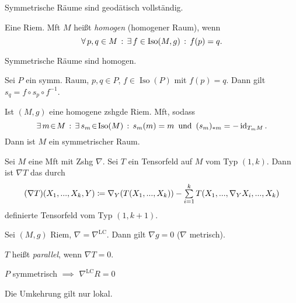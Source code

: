 \documentclass{cheat-sheet}
\DeclareMathOperator{\Iso}{Iso} %
\newcommand{\LC}{\nabla^{\mathrm{LC}}} %
\begin{document}
\begin{kor}
  Symmetrische Räume sind geodätisch vollständig.
\end{kor}

\begin{defn}
  Eine Riem. Mft $M$ heißt \emph{homogen} (homogener Raum), wenn
  \[ \fa{p, q \in M} \ex{f \in \Iso(M, g)} f(p) = q. \]
\end{defn}

\begin{lem}
  Symmetrische Räume sind homogen.
\end{lem}

\begin{lem}
  Sei $P$ ein symm. Raum, $p, q \in P$, $f \in \Iso(P)$ mit $f(p) = q$. Dann gilt $s_q = f \circ s_p \circ f^{-1}$.
\end{lem}

\begin{kor}
  Ist $(M, g)$ eine homogene zshgde Riem. Mft, sodass
  \[
    \ex{m \!\in\! M} \ex{s_m \!\in\! \Iso(M)} s_m(m) = m
    \enspace \text{und} \enspace
    (s_m)_{*m} = - \id_{T_m M}.
  \]
  Dann ist $M$ ein symmetrischer Raum.
\end{kor}

\begin{defn}
  Sei $M$ eine Mft mit Zshg $\nabla$. Sei $T$ ein Tensorfeld auf $M$ vom Typ $(1,k)$. Dann ist $\nabla T$ das durch
  \[
    (\nabla T)(X_1, \nldots, X_k, Y) \coloneqq \nabla_Y(T(X_1, \nldots, X_k)) - \sum_{i=1}^k T(X_1, \nldots, \nabla_Y X_i, \nldots, X_k)
  \]
  definierte Tensorfeld vom Typ $(1, k+1)$.
\end{defn}

\begin{bsp}
  Sei $(M, g)$ Riem, $\nabla = \LC$. Dann gilt $\nabla g = 0$ ($\nabla$ metrisch).
\end{bsp}

\begin{defn}
  $T$ heißt \emph{parallel}, wenn $\nabla T = 0$.
\end{defn}

\begin{satz}
  $P$ symmetrisch $\implies$ $\LC R = 0$
\end{satz}

\begin{bem}
  Die Umkehrung gilt nur lokal.
\end{bem}


\end{document}
